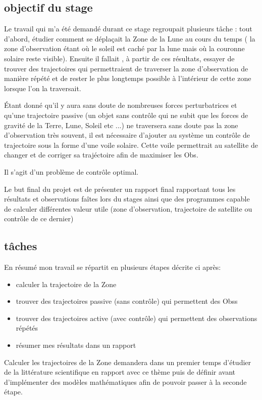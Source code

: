 \documentclass[12pt]{article} %
\begin{document}
		\subsection{objectif du stage}
		Le travail qui m'a été demandé durant ce stage regroupait plusieurs tâche : tout d'abord, étudier comment se déplaçait la \gls{Zone} de la Lune  au cours du temps ( la zone d'observation étant où le soleil est caché par la lune mais où la couronne solaire reste visible). Ensuite il fallait , à partir de ces résultats, essayer de trouver des trajectoires qui permettraient de traverser la zone d'observation de manière répété et de rester le plus longtemps possible à l'intérieur de cette zone lorsque l'on la traversait.
		
		Étant donné qu'il y aura sans doute de nombreuses forces perturbatrices et qu'une trajectoire passive (un objet sans contrôle qui ne subit que les forces de gravité de la Terre, Lune, Soleil etc ...) ne traversera sans doute pas la zone d'observation très souvent, il est nécessaire d'ajouter au système un contrôle de trajectoire sous la forme d'une voile solaire. Cette voile permettrait au satellite de changer et de corriger sa trajéctoire afin de maximiser les \gls{Obs}.
		
		Il s'agit d'un problème de contrôle optimal.
		
		Le but final du projet est de présenter un rapport final rapportant tous les résultats et observations faîtes lors du stages ainsi que des programmes capable de calculer différentes valeur utile (zone d'observation, trajectoire de satellite ou contrôle de ce dernier)
		
		\subsection{tâches}
		En résumé mon travail se répartit en plusieurs étapes décrite ci après:
		\begin{itemize}
			\item calculer la trajectoire de la \gls{Zone}
			\item trouver des trajectoires passive (sans contrôle) qui permettent des \glspl{Obs}
			\item trouver des trajectoires active (avec contrôle) qui permettent des observations répétés 
			\item résumer mes résultats dans un rapport
		\end{itemize}
		
		Calculer les trajectoires de la \gls{Zone} demandera dans un premier temps d'étudier de la littérature scientifique en rapport avec ce thème puis de définir avant d'implémenter des modèles mathématiques afin de pouvoir passer à la seconde étape.
		
\end{document}
